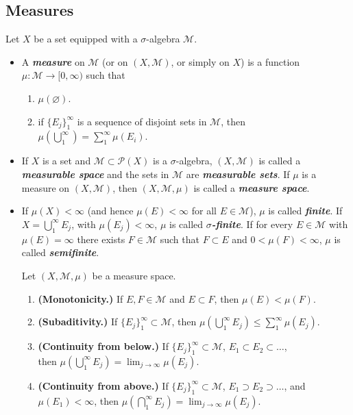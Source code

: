 \documentclass{article}
\theoremstyle{definition}
\numberwithin{equation}{section}
\begin{document}
	\subsection{Measures}
	Let $X$ be a set equipped with a $\sigma$-algebra $\mathcal{M}$.
	\begin{itemize}
		\item A \textbf{\textit{measure}} on $\mathcal{M}$ (or on $(X,\mathcal{M})$, or simply on $X$) is a function $\mu:\mathcal{M}\to [0,\infty)$ such that
		\begin{enumerate}
			\item $\mu(\varnothing)$.
			\item if $\{E_j\}_{1}^\infty$ is a sequence of disjoint sets in $\mathcal{M}$, then $\mu\left(\bigcup_{1}^\infty\right)=\sum_1^\infty\mu(E_i)$.
		\end{enumerate}
		\item If $X$ is a set and $\mathcal{M}\subset\mathcal{P}(X)$ is a $\sigma$-algebra, $(X,\mathcal{M})$ is called a \textbf{\textit{measurable space}} and the sets in $\mathcal{M}$ are \textbf{\textit{measurable sets}}. If $\mu$ is a measure on $(X,\mathcal{M})$, then $(X,\mathcal{M},\mu)$ is called a \textbf{\textit{measure space}}.
		\item If $\mu(X)<\infty$ (and hence $\mu(E)<\infty$ for all $E\in\mathcal{M}$), $\mu$ is called \textbf{\textit{finite}}. If $X=\bigcup_{1}^\infty E_j$, with $\mu(E_j)<\infty$, $\mu$ is called \textbf{\textit{$\sigma$-finite}}. If for every $E\in\mathcal{M}$ with $\mu(E)=\infty$ there exists $F\in\mathcal{M}$ such that $F\subset E$ and $0<\mu(F)<\infty$, $\mu$ is called \textbf{\textit{semifinite}}.
		\begin{thm}
			Let $(X,\mathcal{M},\mu)$ be a measure space.
			\begin{enumerate}
				\item \textbf{(Monotonicity.)} If $E,F\in\mathcal{M}$ and $E\subset F$, then $\mu(E)<\mu(F)$.
				\item \textbf{(Subaditivity.)} If $\{E_j\}_{1}^\infty\subset\mathcal{M}$, then $\mu\left(\bigcup_{1}^\infty E_j\right)\leq\sum_1^\infty\mu(E_j)$.
				\item \textbf{(Continuity from below.)} If $\{E_j\}_1^\infty\subset\mathcal{M}$, $E_1\subset E_2\subset\ldots$,\\ then $\mu(\bigcup_1^\infty E_j)=\lim_{j\to\infty}\mu(E_j)$.
					\item \textbf{(Continuity from above.)} If $\{E_j\}_1^\infty\subset\mathcal{M}$, $E_1\supset E_2\supset\ldots$, and $\mu(E_1)<\infty$, then $\mu(\bigcap_1^\infty E_j)=\lim_{j\to\infty}\mu(E_j)$.

\end{enumerate}
\end{thm}
\end{itemize}
\end{document}
